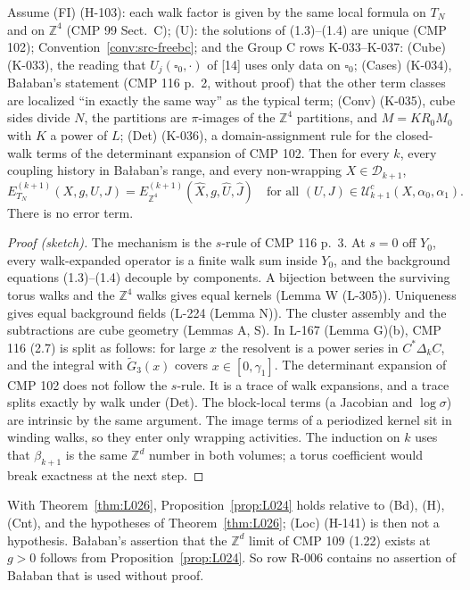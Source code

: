 \begin{theorem}\label{thm:L026}
Assume (FI) (H-103): each walk factor is given by the same local formula on $T_N$ and on $\mathbb Z^4$ (CMP 99 Sect.~C); (U): the solutions of (1.3)--(1.4) are unique (CMP 102); Convention~\ref{conv:src-freebc}; and the Group C rows K-033--K-037:
(Cube) (K-033), the reading that $U_j(\square_0,\cdot)$ of [14] uses only data on $\square_0$;
(Cases) (K-034), Ba{\l}aban's statement (CMP 116 p.~2, without proof) that the other term classes are localized ``in exactly the same way'' as the typical term;
(Conv) (K-035), cube sides divide $N$, the partitions are $\pi$-images of the $\mathbb Z^4$ partitions, and $M=KR_0M_0$ with $K$ a power of $L$;
(Det) (K-036), a domain-assignment rule for the closed-walk terms of the determinant expansion of CMP 102.
Then for every $k$, every coupling history in Ba{\l}aban's range, and every non-wrapping $X\in\mathcal D_{k+1}$,
\[ E^{(k+1)}_{T_N}(X,g,U,J)=E^{(k+1)}_{\mathbb Z^4}(\hat X,g,\hat U,\hat J)\quad\text{for all }(U,J)\in\mathcal U^c_{k+1}(X,\alpha_0,\alpha_1). \]
There is no error term.
\end{theorem}
\begin{proof}[Proof (sketch)]
The mechanism is the $s$-rule of CMP 116 p.~3. At $s=0$ off $Y_0$, every walk-expanded operator is a finite walk sum inside $Y_0$, and the background equations (1.3)--(1.4) decouple by components. A bijection between the surviving torus walks and the $\mathbb Z^4$ walks gives equal kernels (Lemma W (L-305)). Uniqueness gives equal background fields (L-224 (Lemma N)). The cluster assembly and the subtractions are cube geometry (Lemmas A, S). In L-167 (Lemma G)(b), CMP 116 (2.7) is split as follows: for large $x$ the resolvent is a power series in $C^*\Delta_kC$, and the integral with $\tilde G_3(x)$ covers $x\in[0,\gamma_1]$. The determinant expansion of CMP 102 does not follow the $s$-rule. It is a trace of walk expansions, and a trace splits exactly by walk under (Det). The block-local terms (a Jacobian and $\log\sigma$) are intrinsic by the same argument. The image terms of a periodized kernel sit in winding walks, so they enter only wrapping activities. The induction on $k$ uses that $\beta_{k+1}$ is the same $\mathbb Z^d$ number in both volumes; a torus coefficient would break exactness at the next step.
\end{proof}
With Theorem~\ref{thm:L026}, Proposition~\ref{prop:L024} holds relative to (Bd), (H), (Cnt), and the hypotheses of Theorem~\ref{thm:L026}; (Loc) (H-141) is then not a hypothesis. Ba{\l}aban's assertion that the $\mathbb Z^d$ limit of CMP 109 (1.22) exists at $g>0$ follows from Proposition~\ref{prop:L024}. So row R-006 contains no assertion of Ba{\l}aban that is used without proof.

